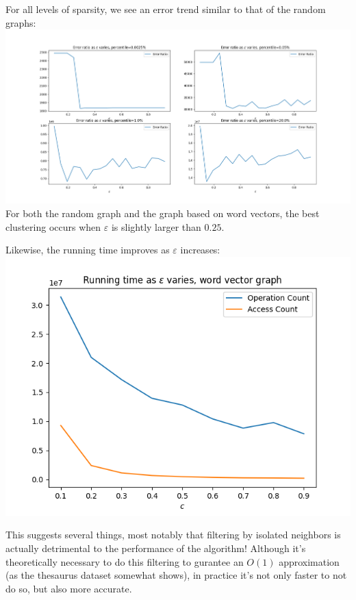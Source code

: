 \documentclass[
]{article}
\begin{document}
For all levels of sparsity, we see an error trend similar to that of the
random graphs:\\
\includegraphics{images/percentile_change.png}\\
For both the random graph and the graph based on word vectors, the best
clustering occurs when {\(\varepsilon\)} is slightly larger than
{\(0.25\)}.

Likewise, the running time improves as {\(\varepsilon\)} increases:\\
\includegraphics{images/running_time_as_eps_varies_word_vector.png}

This suggests several things, most notably that filtering by isolated
neighbors is actually detrimental to the performance of the algorithm!
Although it's theoretically necessary to do this
filtering to gurantee an {\(O(1)\)} approximation (as the thesaurus
dataset somewhat shows), in practice it's not only
faster to not do so, but also more accurate.
\end{document}
